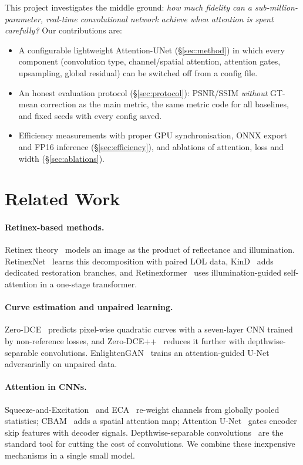 \documentclass[10pt,twocolumn,letterpaper]{article}
\begin{document}
This project investigates the middle ground: \emph{how much fidelity can a
sub-million-parameter, real-time convolutional network achieve when attention
is spent carefully?} Our contributions are:
\begin{itemize}\itemsep0pt
\item A configurable lightweight Attention-UNet (\S\ref{sec:method}) in which
  every component (convolution type, channel/spatial attention, attention
  gates, upsampling, global residual) can be switched off from a config file.
\item An honest evaluation protocol (\S\ref{sec:protocol}): PSNR/SSIM
  \emph{without} GT-mean correction as the main metric, the same metric code
  for all baselines, and fixed seeds with every config saved.
\item Efficiency measurements with proper GPU synchronisation, ONNX export and
  FP16 inference (\S\ref{sec:efficiency}), and ablations of attention, loss
  and width (\S\ref{sec:ablations}).
\end{itemize}

\section{Related Work}
\paragraph{Retinex-based methods.} Retinex theory~\cite{land1977retinex}
models an image as the product of reflectance and illumination.
RetinexNet~\cite{wei2018deep} learns this decomposition with paired LOL data,
KinD~\cite{zhang2019kind} adds dedicated restoration branches, and
Retinexformer~\cite{cai2023retinexformer} uses illumination-guided
self-attention in a one-stage transformer.

\paragraph{Curve estimation and unpaired learning.} Zero-DCE~\cite{guo2020zero}
predicts pixel-wise quadratic curves with a seven-layer CNN trained by
non-reference losses, and Zero-DCE++~\cite{li2021learning} reduces it further
with depthwise-separable convolutions. EnlightenGAN~\cite{jiang2021enlightengan}
trains an attention-guided U-Net adversarially on unpaired data.

\paragraph{Attention in CNNs.} Squeeze-and-Excitation~\cite{hu2018squeeze}
and ECA~\cite{wang2020eca} re-weight channels from globally pooled
statistics; CBAM~\cite{woo2018cbam} adds a spatial attention map; Attention
U-Net~\cite{oktay2018attention} gates encoder skip features with decoder
signals. Depthwise-separable convolutions~\cite{howard2017mobilenets} are the
standard tool for cutting the cost of convolutions. We combine these
inexpensive mechanisms in a single small model.
\end{document}
